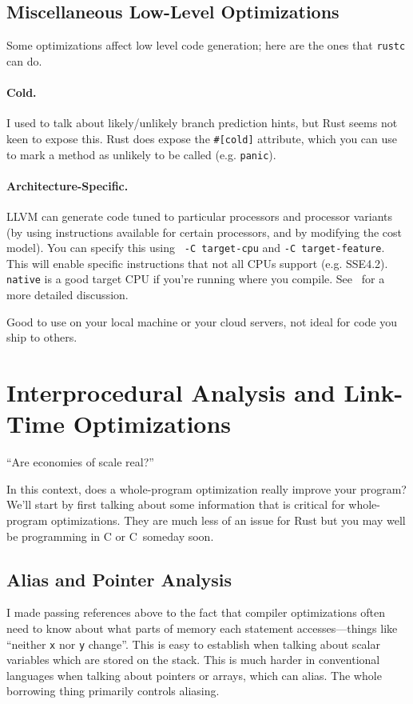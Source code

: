 \documentclass[a4paper]{report}
\newcommand{\CPP}{C\nolinebreak\hspace{-.05em}\raisebox{.4ex}{\tiny\bf +}\nolinebreak\hspace{-.10em}\raisebox{.4ex}{\tiny\bf +}}
\def\CPP{{C\nolinebreak[4]\hspace{-.05em}\raisebox{.4ex}{\tiny\bf ++}}}
\begin{document}
\subsection*{Miscellaneous Low-Level Optimizations}
Some optimizations affect low level code generation; here are the ones that
{\tt rustc} can do.

\paragraph{Cold.} I used to talk about likely/unlikely branch prediction hints,
but Rust seems not keen to expose this. Rust does expose the \verb+#[cold]+
attribute, which you can use to mark a method as unlikely to be called (e.g. \texttt{panic}).

\paragraph{Architecture-Specific.} LLVM can generate code tuned to particular
processors and processor variants (by using instructions available for certain processors,
and by modifying the cost model). You can specify this using {\tt
  -C target-cpu} and {\tt -C target-feature}.
This will enable specific instructions that not all CPUs support (e.g. SSE4.2).
{\tt native} is a good target CPU if you're running where you compile.
See~\cite{wilcox20:_target_featur_target_cpu_rust}
for a more detailed discussion. 

\noindent
Good to use on your local machine or your cloud servers, not ideal for code you ship to others.


\section*{Interprocedural Analysis and Link-Time Optimizations}
\hfill ``Are economies of scale real?''

In this context, does a
whole-program optimization really improve your program?
We'll start by first talking about some information that is critical for
whole-program optimizations. They are much less of an issue for Rust but
you may well be programming in C or \CPP~someday soon.

\subsection*{Alias and Pointer Analysis}
I made passing references above to the fact that compiler optimizations often need
to know about what parts of memory each statement accesses---things like ``neither
{\tt x} nor {\tt y} change''. This is
easy to establish when talking about scalar variables which are stored on the
stack. This is much harder in conventional languages when talking about pointers or arrays, which can alias. The whole borrowing thing primarily controls aliasing.
\end{document}
